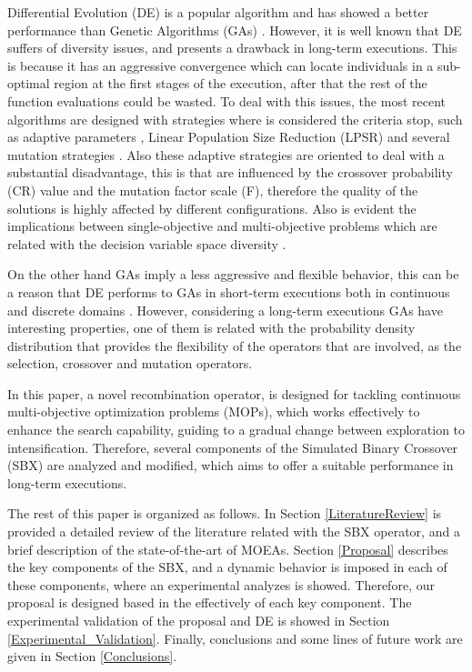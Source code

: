 Differential Evolution (DE) is a popular algorithm and has showed a better performance than Genetic Algorithms (GAs) \cite{tuvsar2007differential, mi2010improved}.
%
However, it is well known that DE suffers of diversity issues, and presents a drawback in long-term executions.
%
This is because it has an aggressive convergence which can locate individuals in a sub-optimal region at the first stages of the execution, after that the rest of the function evaluations could be wasted.
%
To deal with this issues, the most recent algorithms are designed with strategies where is considered the criteria stop, such as adaptive parameters \cite{brest2017single}, Linear Population Size Reduction (LPSR) \cite{brest2008population} and several mutation strategies \cite{das2011differential}.
%
Also these adaptive strategies are oriented to deal with a substantial disadvantage, this is that are influenced by the crossover probability (CR) value and the mutation factor scale (F), therefore the quality of the solutions is highly affected by different configurations.
%
Also is evident the implications between single-objective and multi-objective problems which are related with the decision variable space diversity \cite{kukkonen2007performance}.

%
On the other hand GAs imply a less aggressive and flexible behavior, this can be a reason that DE performs to GAs in short-term executions both in continuous and discrete domains  \cite{tuvsar2007differential, mi2010improved}.
%
However, considering a long-term executions GAs have interesting properties, one of them is related with the probability density distribution that provides the flexibility of the operators that are involved, as the selection, crossover and  mutation operators.
%

In this paper, a novel recombination operator, is designed for tackling continuous multi-objective optimization problems (MOPs), which works effectively to enhance the search capability, guiding to a gradual change between exploration to intensification.
%
Therefore, several components of the Simulated Binary Crossover (SBX) are analyzed and modified, which aims to offer a suitable performance in long-term executions.
%

The rest of this paper is organized as follows.
%
In Section \ref{LiteratureReview} is provided a detailed review of the literature related with the SBX operator, and a brief description of the state-of-the-art of MOEAs.
%
Section \ref{Proposal} describes the key components of the SBX, and a dynamic behavior is imposed in each of these components, where an experimental analyzes is showed.
%
Therefore, our proposal is designed based in the effectively of each key component.
%
The experimental validation of the proposal and DE is showed in Section \ref{Experimental_Validation}.
%
Finally, conclusions and some lines of future work are given in Section \ref{Conclusions}.

